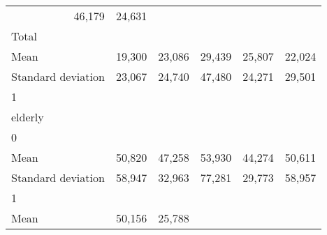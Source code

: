 \begin{tabular}{llllll}
  \multicolumn{1}{r}{46,179} &
  \multicolumn{1}{r}{24,631} \\
\multicolumn{1}{l}{\hspace{3em}Total} &
  \multicolumn{1}{|r}{} &
  \multicolumn{1}{r}{} &
  \multicolumn{1}{r}{} &
  \multicolumn{1}{r}{} &
  \multicolumn{1}{r}{} \\
\multicolumn{1}{l}{\hspace{4em}Mean} &
  \multicolumn{1}{|r}{19,300} &
  \multicolumn{1}{r}{23,086} &
  \multicolumn{1}{r}{29,439} &
  \multicolumn{1}{r}{25,807} &
  \multicolumn{1}{r}{22,024} \\
\multicolumn{1}{l}{\hspace{4em}Standard deviation} &
  \multicolumn{1}{|r}{23,067} &
  \multicolumn{1}{r}{24,740} &
  \multicolumn{1}{r}{47,480} &
  \multicolumn{1}{r}{24,271} &
  \multicolumn{1}{r}{29,501} \\
\multicolumn{1}{l}{\hspace{1em}1} &
  \multicolumn{1}{|r}{} &
  \multicolumn{1}{r}{} &
  \multicolumn{1}{r}{} &
  \multicolumn{1}{r}{} &
  \multicolumn{1}{r}{} \\
\multicolumn{1}{l}{\hspace{2em}elderly} &
  \multicolumn{1}{|r}{} &
  \multicolumn{1}{r}{} &
  \multicolumn{1}{r}{} &
  \multicolumn{1}{r}{} &
  \multicolumn{1}{r}{} \\
\multicolumn{1}{l}{\hspace{3em}0} &
  \multicolumn{1}{|r}{} &
  \multicolumn{1}{r}{} &
  \multicolumn{1}{r}{} &
  \multicolumn{1}{r}{} &
  \multicolumn{1}{r}{} \\
\multicolumn{1}{l}{\hspace{4em}Mean} &
  \multicolumn{1}{|r}{50,820} &
  \multicolumn{1}{r}{47,258} &
  \multicolumn{1}{r}{53,930} &
  \multicolumn{1}{r}{44,274} &
  \multicolumn{1}{r}{50,611} \\
\multicolumn{1}{l}{\hspace{4em}Standard deviation} &
  \multicolumn{1}{|r}{58,947} &
  \multicolumn{1}{r}{32,963} &
  \multicolumn{1}{r}{77,281} &
  \multicolumn{1}{r}{29,773} &
  \multicolumn{1}{r}{58,957} \\
\multicolumn{1}{l}{\hspace{3em}1} &
  \multicolumn{1}{|r}{} &
  \multicolumn{1}{r}{} &
  \multicolumn{1}{r}{} &
  \multicolumn{1}{r}{} &
  \multicolumn{1}{r}{} \\
\multicolumn{1}{l}{\hspace{4em}Mean} &
  \multicolumn{1}{|r}{50,156} &
  \multicolumn{1}{r}{25,788} &

\end{tabular}
